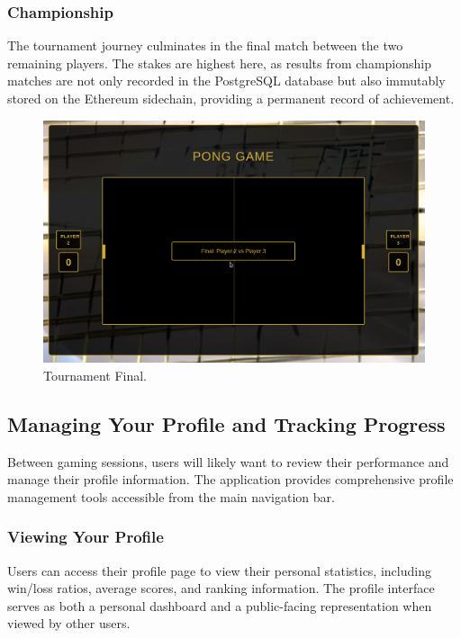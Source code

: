 \subsubsection{Championship} The tournament journey culminates in the final match between the two remaining players. The stakes are highest here, as results from championship matches are not only recorded in the PostgreSQL database but also immutably stored on the Ethereum sidechain, providing a permanent record of achievement.

\begin{figure}[H]
    \centering
    \includegraphics[width=0.65\linewidth]{Figures/images/new_images/GameTournementFinal.png}
    \caption{Tournament Final.} %
    \label{fig:tournament-final-journey}
\end{figure}

\subsection{Managing Your Profile and Tracking Progress}

Between gaming sessions, users will likely want to review their performance and manage their profile information. The application provides comprehensive profile management tools accessible from the main navigation bar.

\subsubsection{Viewing Your Profile} Users can access their profile page to view their personal statistics, including win/loss ratios, average scores, and ranking information. The profile interface serves as both a personal dashboard and a public-facing representation when viewed by other users.


